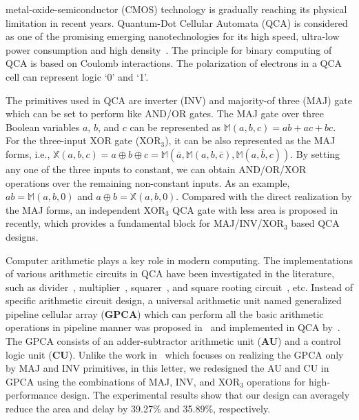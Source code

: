 \documentclass[9pt,journal,compsoc]{IEEEtran}
\begin{document}
\maketitle
\IEEEdisplaynontitleabstractindextext
\IEEEpeerreviewmaketitle
{}
 metal-oxide-semiconductor (CMOS) technology is gradually reaching its physical limitation in recent years. Quantum-Dot Cellular Automata (QCA) is considered as one of the promising emerging nanotechnologies for its high speed, ultra-low power consumption and high density~\cite{1}. The principle for binary computing of QCA is based on Coulomb interactions. The polarization of electrons in a QCA cell can represent logic `0' and `1'. 

The primitives used in QCA are inverter (INV) and majority-of three (MAJ) gate which can be set to perform like AND/OR gates. 
The MAJ gate over three Boolean variables $a$, $b$, and $c$ can be represented as $\mathbb{M}(a,b,c)=ab+ac+bc$.
For the three-input XOR gate (XOR$_3$), it can be also represented as the MAJ forms, i.e., $\mathbb{X}(a,b,c)=a \oplus b \oplus c= \mathbb{M}(\bar a, \mathbb{M}(a,b,\bar c), \mathbb{M}(a,\bar b, c))$. By setting any one of the three inputs to constant, we can obtain AND/OR/XOR operations over the remaining non-constant inputs.
As an example, $ab=\mathbb{M}(a,b,0)$ and $a\oplus b = \mathbb{X}(a,b,0)$. Compared with the direct realization by the MAJ forms, an independent XOR$_{3}$ QCA gate with less area is proposed in~\cite{3} recently, which provides a fundamental block for MAJ/INV/XOR$_3$ based QCA designs.

Computer arithmetic plays a key role in modern computing. 
The implementations of various arithmetic circuits in QCA have been investigated in the literature, such as divider~\cite{sasamal2016design}, multiplier~\cite{lu2011qca,liu2013design}, squarer~\cite{giannou2012squarers}, and square rooting circuit~\cite{jahangir2015designing}, etc. 
Instead of specific arithmetic circuit design, a universal arithmetic unit named generalized pipeline cellular array (\textbf{GPCA}) which can perform all the basic arithmetic operations in pipeline manner was proposed in~\cite{4} and implemented in QCA by~\cite{2}. The GPCA consists of an adder-subtractor arithmetic unit (\textbf{AU}) and a control logic unit (\textbf{CU}). Unlike the work in~\cite{2} which focuses on realizing the GPCA only by MAJ and INV primitives, in this letter, we redesigned the AU and CU in GPCA using the combinations of MAJ, INV, and XOR$_3$ operations for high-performance design. The experimental results show that our design can averagely reduce the area and delay by 39.27\% and 35.89\%, respectively.
 
\end{document}

